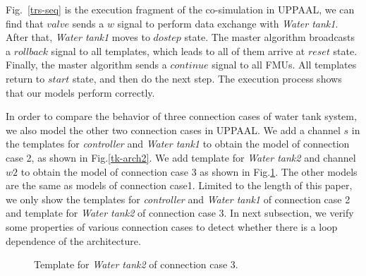 Fig.~\ref{trs-seq} is the execution fragment of the co-simulation in UPPAAL, we can find that $valve$ sends a $w$ signal to perform data exchange with \emph{Water tank1}. After that, \emph{Water tank1}  moves to $dostep$ state. The master algorithm broadcasts a $rollback$ signal to all templates, which leads to all of them arrive at $reset$ state. Finally, the master algorithm sends a $continue$ signal to all FMUs. All templates return to $start$ state, and then do the next step. The execution process shows that our models perform correctly.

In order to compare the behavior of three connection cases of water tank system, we also model the other two connection cases in UPPAAL. We add a channel $s$ in the templates for \emph{controller} and \emph{Water tank1} to obtain the model of connection case 2, as shown in Fig.\ref{tk-arch2}. We add template for \emph{Water tank2} and channel $w2$ to obtain the model of connection case 3 as shown in Fig.\ref{arc3}. The other models are the same as models of connection case1. Limited to the length of this paper, we only show the templates for \emph{controller} and \emph{Water tank1} of connection case 2 and template for \emph{Water tank2} of connection case 3. In next subsection, we verify some properties of various connection cases to detect whether there is a loop dependence of the architecture.
\begin{figure}[htbp]
\end{figure}
\begin{figure}[htbp]
	\caption{Template for \emph{Water tank2} of connection case 3.}\label{arc3}
\end{figure}

